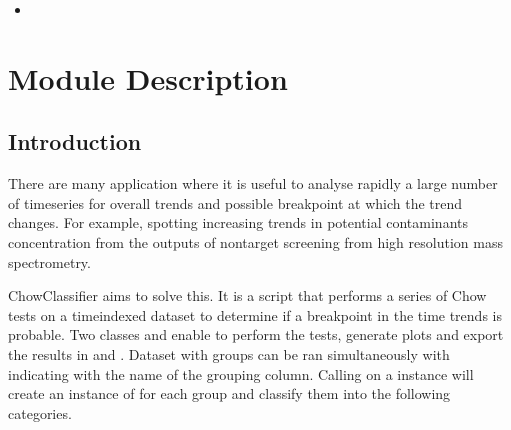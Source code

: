 \documentclass[letterpaper,10pt,english]{sphinxmanual}
\begin{document}
\begin{sphinxShadowBox}
\begin{itemize}
\begin{itemize}
\item {} 
\sphinxAtStartPar
{}\label{\detokenize{index:id14}}{\hyperref[\detokenize{index:save-to-file}]{}}

\end{itemize}

\item {} 
\sphinxAtStartPar
{}\label{\detokenize{index:id15}}{\hyperref[\detokenize{index:version-changes}]{}}

\end{itemize}
\end{sphinxShadowBox}


\chapter{Module Description}
\label{\detokenize{index:module-description}}

\section{Introduction}
\label{\detokenize{index:introduction}}
\sphinxAtStartPar
There are many application where it is useful to analyse rapidly a large number of time\sphinxhyphen{}series for overall trends and possible breakpoint at which the trend changes. For example, spotting increasing trends in potential contaminants concentration from the outputs of non\sphinxhyphen{}target screening from high resolution mass spectrometry.

\sphinxAtStartPar
ChowClassifier aims to solve this. It is a script that performs a series of Chow tests on a time\sphinxhyphen{}indexed dataset to determine if a breakpoint in the time trends is probable. Two classes  and  enable to perform the tests, generate plots and export the results in  and . Dataset with groups can be ran simultaneously with  indicating with  the name of the grouping column. Calling  on a  instance will create an instance of  for each group and classify them into the following categories.
\end{document}
